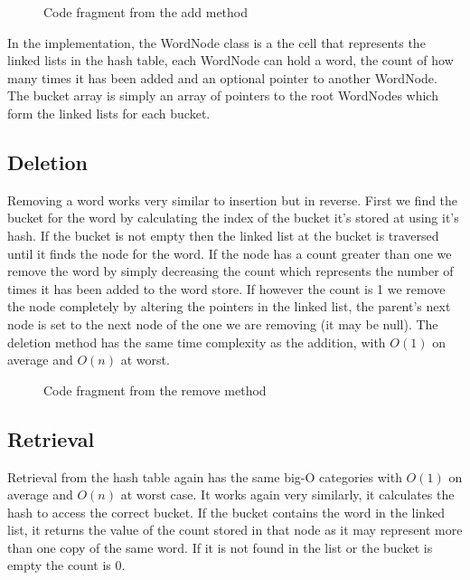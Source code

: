\documentclass[12pt]{article}
\begin{document}
\begin{figure}[!htp]
\centering
{}
\caption{Code fragment from the add method}
\label{lst:addition_method}
\end{figure}

In the implementation, the WordNode class is a the cell that represents the linked lists in the hash table, each WordNode can hold a word, the count of how many times it has been added and an optional pointer to another WordNode. The bucket array is simply an array of pointers to the root WordNodes which form the linked lists for each bucket.

\subsection{Deletion}
Removing a word works very similar to insertion but in reverse. First we find the bucket for the word by calculating the index of the bucket it's stored at using it's hash. If the bucket is not empty then the linked list at the bucket is traversed until it finds the node for the word. If the node has a count greater than one we remove the word by simply decreasing the count which represents the number of times it has been added to the word store. If however the count is 1 we remove the node completely by altering the pointers in the linked list, the parent's next node is set to the next node of the one we are removing (it may be null). The deletion method has the same time complexity as the addition, with $O(1)$ on average and $O(n)$ at worst.

\begin{figure}[!htp]
\centering
{}
\caption{Code fragment from the remove method}
\label{lst:remove_method}
\end{figure}

\subsection{Retrieval}
Retrieval from the hash table again has the same big-O categories with $O(1)$ on average and $O(n)$ at worst case. It works again very similarly, it calculates the hash to access the correct bucket. If the bucket contains the word in the linked list, it returns the value of the count stored in that node as it may represent more than one copy of the same word. If it is not found in the list or the bucket is empty the count is 0.
\end{document}
